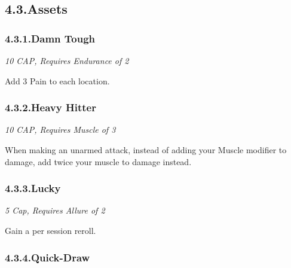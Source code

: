 \documentclass{article}
\begin{document}
\subsection{4.3.\hspace*{0.5em}Assets}\label{sec-assets}%

\subsubsection{4.3.1.\hspace*{0.5em}Damn Tough}\label{sec-damn-tough}%

\noindent{}\emph{10 CAP, Requires Endurance of 2}%

Add 3 Pain to each location.%

\subsubsection{4.3.2.\hspace*{0.5em}Heavy Hitter}\label{sec-heavy-hitter}%

\noindent{}\emph{10 CAP, Requires Muscle of 3}%

When making an unarmed attack, instead of adding your Muscle modifier to damage, add twice your muscle to damage instead.%

\subsubsection{4.3.3.\hspace*{0.5em}Lucky}\label{sec-lucky}%

\noindent{}\emph{5 Cap, Requires Allure of 2}%

Gain a per session reroll.%

\subsubsection{4.3.4.\hspace*{0.5em}Quick-Draw}\label{sec-quick-draw}%
\end{document}
